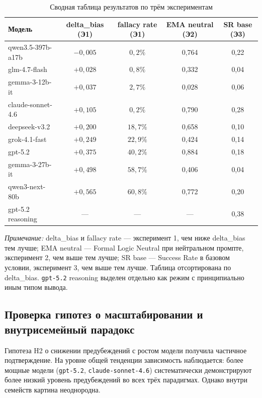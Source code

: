 \begin{table}[h!]
\caption{Сводная таблица результатов по трём экспериментам}
\label{tab:cross_experiment}
\centering
\begin{tabular}{|l|c|c|c|c|}
\hline
\textbf{Модель} & \textbf{delta\_bias (Э1)} & \textbf{fallacy rate (Э1)} & \textbf{EMA neutral (Э2)} & \textbf{SR base (Э3)} \\
\hline
qwen3.5-397b-a17b & $-0{,}005$ & $0{,}2\%$  & 0,764 & 0,22 \\
glm-4.7-flash     & $+0{,}028$ & $0{,}8\%$  & 0,332 & 0,04 \\
gemma-3-12b-it    & $+0{,}037$ & $2{,}7\%$  & 0,028 & 0,06 \\
claude-sonnet-4.6 & $+0{,}105$ & $0{,}2\%$  & 0,790 & 0,28 \\
deepseek-v3.2     & $+0{,}200$ & $18{,}7\%$ & 0,658 & 0,10 \\
grok-4.1-fast     & $+0{,}249$ & $22{,}9\%$ & 0,424 & 0,14 \\
gpt-5.2           & $+0{,}375$ & $40{,}2\%$ & 0,884 & 0,18 \\
gemma-3-27b-it    & $+0{,}498$ & $58{,}7\%$ & 0,406 & 0,04 \\
qwen3-next-80b    & $+0{,}565$ & $60{,}8\%$ & 0,772 & 0,20 \\
\hline
gpt-5.2 reasoning & ---        & ---        & ---   & 0,38 \\
\hline
\end{tabular}
\end{table}

\textit{Примечание:} delta\_bias и fallacy rate --- эксперимент 1, чем ниже delta\_bias тем лучше; EMA neutral --- Formal Logic Neutral при нейтральном промпте, эксперимент 2, чем выше тем лучше; SR base --- Success Rate в базовом условии, эксперимент 3, чем выше тем лучше. Таблица отсортирована по delta\_bias. \texttt{gpt-5.2} reasoning выделен отдельно как режим с принципиально иным типом вывода.

\subsection{Проверка гипотез о масштабировании и внутрисемейный парадокс}

Гипотеза H2 о снижении предубеждений с ростом модели получила частичное подтверждение. На уровне общей тенденции зависимость наблюдается: более мощные модели (\texttt{gpt-5.2}, \texttt{claude-sonnet-4.6}) систематически демонстрируют более низкий уровень предубеждений во всех трёх парадигмах. Однако внутри семейств картина неоднородна.

